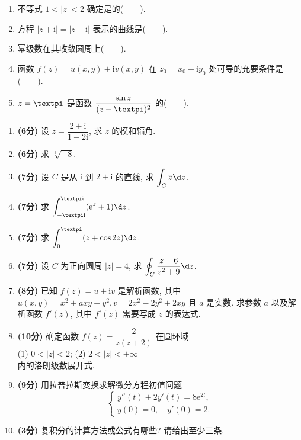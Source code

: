 \documentclass[simple]{hfutexam}
\newcommand{\ii}{\mathrm{i}}
\newcommand{\ee}{\mathrm{e}}
\newcommand{\cpi}{{\text{\textpi}}}
\newcommand{\dint}{\displaystyle\int}
\newcommand{\doint}{\displaystyle\oint}
\newcommand\ov{\overline}
\begin{document}
\begin{enumerate}
  \item 不等式 $1<|z|<2$ 确定是的(~~~~).
  \item 方程 $|z+\ii|=|z-\ii|$ 表示的曲线是(~~~~).
  \item 幂级数在其收敛圆周上(~~~~).
  \item 函数 $f(z)=u(x,y)+\ii v(x,y)$ 在 $z_0=x_0+\ii y_0$ 处可导的充要条件是(~~~~).
  \item $z=\cpi$ 是函数 $\dfrac{\sin z}{(z-\cpi)^2}$ 的(~~~~).
\end{enumerate}

\begin{enumerate}
  \item \textbf{(6分)} 设 $z=\dfrac{2+\ii}{1-2\ii}$, 求 $z$ 的模和辐角.
  \item \textbf{(6分)} 求 $\sqrt[3]{-8}$.
  \item \textbf{(7分)} 设 $C$ 是从 $\ii$ 到 $2+\ii$ 的直线, 求 $\dint_C \ov z\d z$.
  \item \textbf{(7分)} 求 $\dint_{-\cpi\ii}^{\cpi\ii}(\ee^z+1)\d z$.
  \item \textbf{(7分)} 求 $\dint_0^\cpi (z+\cos 2z)\d z$.
  \item \textbf{(7分)} 设 $C$ 为正向圆周 $|z|=4$, 求 $\doint_C\frac{z-6}{z^2+9}\d z$.
  \item \textbf{(8分)} 已知 $f(z)=u+\ii v$ 是解析函数, 其中 $u(x,y)=x^2+axy-y^2, v=2x^2-2y^2+2xy$ 且 $a$ 是实数.
求参数 $a$ 以及解析函数 $f'(z)$, 其中 $f'(z)$ 需要写成 $z$ 的表达式.
  \item \textbf{(10分)} 确定函数 $f(z)=\dfrac{2}{z(z+2)}$ 在圆环域\\
\indent (1) $0<|z|<2$; \hspace{2em} (2) $2<|z|<+\infty$\\
内的洛朗级数展开式.
  \item \textbf{(9分)} 用拉普拉斯变换求解微分方程初值问题
\[\begin{cases}
  y''(t)+2y'(t)=8\ee^{2t},\\
  y(0)=0,\quad y'(0)=2.
\end{cases}\]
  \item \textbf{(3分)} 复积分的计算方法或公式有哪些? 请给出至少三条.
\end{enumerate}
\end{document}
